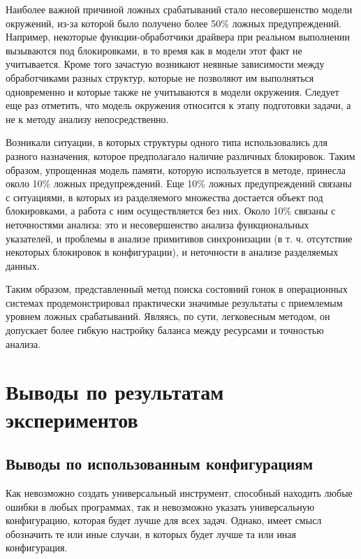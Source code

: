 Наиболее важной причиной ложных срабатываний стало несовершенство модели окружений, из-за которой было  получено  более  50\%  ложных  предупреждений.
Например,  некоторые функции-обработчики  драйвера  при  реальном  выполнении  вызываются  под блокировками, в то время как в модели этот факт не учитывается.
Кроме того зачастую  возникают  неявные  зависимости  между  обработчиками  разных структур,  которые  не  позволяют  им  выполняться одновременно  и  которые также  не  учитываются  в  модели  окружения.
Следует  еще  раз  отметить, что модель окружения относится к этапу подготовки задачи, а не к методу анализу непосредственно. 

Возникали  ситуации,  в  которых  структуры  одного  типа  использовались  для разного  назначения,  которое  предполагало  наличие  различных  блокировок. 
Таким образом, упрощенная модель памяти, которую используется в методе, принесла около 10\% ложных предупреждений. 
Еще 10\%  ложных  предупреждений  связаны  с  ситуациями,  в  которых  из разделяемого множества достается объект под блокировками, а работа с ним 
осуществляется  без них.
Около 10\% связаны с  неточностями анализа: это и несовершенство анализа функциональных указателей, и проблемы в анализе примитивов  синхронизации  (в т. ч. отсутствие некоторых  блокировок  в конфигурации), и неточности в анализе разделяемых данных.  

Таким   образом,   представленный   метод   поиска  состояний  гонок в операционных системах продемонстрировал практически значимые результаты
с приемлемым уровнем ложных срабатываний.
Являясь, по сути, легковесным методом, он допускает более гибкую настройку баланса между ресурсами и точностью анализа.


\section{Выводы по результатам экспериментов}

\subsection{Выводы по использованным конфигурациям}

Как невозможно создать универсальный инструмент, способный находить любые ошибки в любых программах, так и невозможно указать универсальную конфигурацию, которая будет лучше для всех задач. 
Однако, имеет смысл обозначить те или иные случаи, в которых будет лучше та или иная конфигурация.

